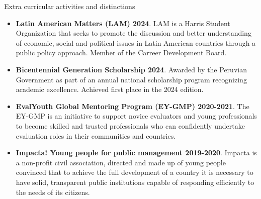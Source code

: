 \documentclass{resume} %
\begin{document}
\begin{rSection}{Extra curricular activities and distinctions}
    \begin{itemize}
        \item \textbf{Latin American Matters (LAM) 2024}. LAM is a Harris Student Organization that seeks to promote the discussion and better understanding of economic, social and political issues in Latin American countries through a public policy approach. Member of the Carreer Development Board.
        \item \textbf{Bicentennial Generation Scholarship 2024}. Awarded by the Peruvian Government as part of an annual national scholarship program recognizing academic excellence. Achieved first place in the 2024 edition.
        \item \textbf{EvalYouth Global Mentoring Program (EY-GMP) 2020-2021}. The EY-GMP is an initiative to support novice evaluators and young professionals to become skilled and trusted professionals who can confidently undertake evaluation roles in their communities and countries. 
        \item \textbf{Impacta! Young people for public management 2019-2020}. Impacta is a non-profit civil association, directed and made up of young people convinced that to achieve the full development of a country it is necessary to have solid, transparent public institutions capable of responding efficiently to the needs of its citizens.
    \end{itemize}
\end{rSection}
\end{document}
